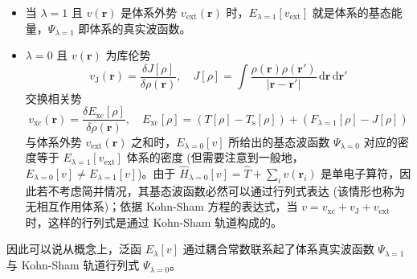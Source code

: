 \begin{itemize}[nosep]
  \item 当 $\lambda = 1$ 且 $v(\bm{r})$ 是体系外势 $v_\mathrm{ext} (\bm{r})$ 时，$E_{\lambda=1} [v_\mathrm{ext}]$ 就是体系的基态能量，$\Psi_{\lambda=1}$ 即体系的真实波函数。

  \item $\lambda = 0$ 且 $v(\bm{r})$ 为库伦势
  $$v_\mathrm{J} (\bm{r}) = \frac{\delta J[\rho]}{\delta \rho(\bm{r})}, \quad J[\rho] = \int \frac{\rho(\bm{r}) \rho(\bm{r}')}{|\bm{r} - \bm{r}'|} \, \mathrm{d} \bm{r} \, \mathrm{d} \bm{r}'$$
  交换相关势
  \begin{equation*}
    v_\mathrm{xc} (\bm{r}) = \frac{\delta E_\mathrm{xc}[\rho]}{\delta \rho(\bm{r})}, \quad E_\mathrm{xc} [\rho] = (T[\rho] - T_\mathrm{s} [\rho]) + (F_{\lambda=1} [\rho] - J[\rho])
  \end{equation*}
  与体系外势 $v_\mathrm{ext} (\bm{r})$ 之和时，$E_{\lambda=0} [v]$ 所给出的基态波函数 $\Psi_{\lambda=0}$ 对应的密度等于 $E_{\lambda=1} [v_\mathrm{ext}]$ 体系的密度 (但需要注意到一般地，$E_{\lambda=0} [v] \neq E_{\lambda=1} [v]$)。由于 $\hat H_{\lambda=0} [v] = \hat T + \sum_{i} v(\bm{r}_i)$ 是单电子算符，因此若不考虑简并情况，其基态波函数必然可以通过行列式表达 (该情形也称为无相互作用体系)；依据 Kohn-Sham 方程的表达式，当 $v = v_\mathrm{xc} + v_\mathrm{J} + v_\mathrm{ext}$ 时，这样的行列式是通过 Kohn-Sham 轨道构成的。
\end{itemize}
因此可以说从概念上，泛函 $E_\lambda [v]$ 通过耦合常数联系起了体系真实波函数 $\Psi_{\lambda = 1}$ 与 Kohn-Sham 轨道行列式 $\Psi_{\lambda = 0}$。

